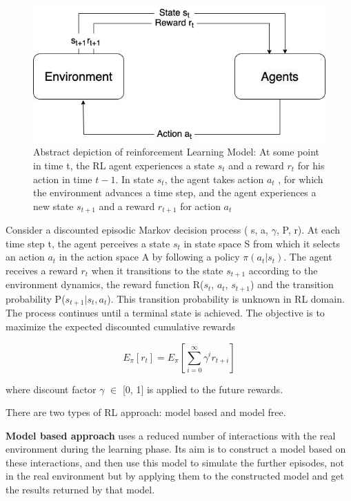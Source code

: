\documentclass[12pt]{report}
\begin{document}
\begin{figure}[!h]
    \centering
    \includegraphics[width=12cm]{RLAbstract.jpg}
    \caption{Abstract depiction of reinforcement Learning Model: At some point in time t, the RL agent experiences a state $s_t$ and a reward $r_t$ for his action in time $t-1$. In state $s_t$, the agent takes action $a_t$ , for which the environment advances a time step, and the agent experiences a new state $s_{t+1}$ and a reward $r_{t+1}$ for action $a_{t}$}
    \label{fig:ReinforcementLearningModel}
\end{figure}

Consider a discounted episodic Markov decision process ( s, a, $\gamma$, P, r). At each time step t, the agent perceives a state $s_t$ in state space S from which it selects an action $a_t$ in the action space A by following a policy $\pi(a_t | s_t)$. The agent receives a reward $r_t$ when it transitions to the state $s_{t+1}$ according to the environment dynamics, the reward function R($s_t$, $a_t$, $s_{t+1}$) and the transition probability P($s_{t+1} | s_t , a_t $). This transition probability is unknown in RL domain. The process continues until a terminal state is achieved. The objective is to maximize the expected discounted cumulative rewards

\begin{equation}\label{disc_rew}
	E_\pi[r_t] = E_\pi[ \sum_{i=0}^{\infty} \gamma^i r_{t+i}]  
\end{equation}

where discount factor $\gamma$ $\in$ [0, 1] is applied to the future rewards. 

There are two types of RL approach: model based and model free. 

\textbf{Model based approach} uses a reduced number of interactions with the real environment during the learning phase. Its aim is to construct a model based on these interactions, and then use this model to simulate the further episodes, not in the real environment but by applying them to the constructed model and get the results returned by that model.
\end{document}
